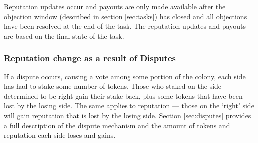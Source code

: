 Reputation updates occur and payouts are only made available after the objection window (described in section \ref{sec:tasks}) has closed and all objections have been resolved at the end of the task. The reputation updates and payouts are based on the final state of the task.


\subsubsection{Reputation change as a result of Disputes}\label{sec:earning-rep-in-disputes}
If a dispute occurs, causing a vote among some portion of the colony, each side has had to stake some number of tokens. Those who staked on the side determined to be right gain their stake back, plus some tokens that have been lost by the losing side. The same applies to reputation --- those on the `right' side will gain reputation that is lost by the losing side. Section \ref{sec:disputes} provides a full description of the dispute mechanism and the amount of tokens and reputation each side loses and gains.




